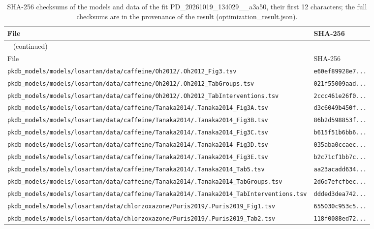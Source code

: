 \documentclass{article}
\begin{document}
\begin{longtable}{ll}
\caption{SHA-256 checksums of the models and data of the fit PD\_20261019\_134029\_\_a3a50, their first 12 characters; the full checksums are in the provenance of the result (optimization\_result.json).}\label{tab:checksums:PD_20261019_134029__a3a50} \\
\toprule
File & SHA-256 \\
\midrule
\endfirsthead
\multicolumn{2}{l}{\small\tablename~\thetable{} (continued)} \\
\toprule
File & SHA-256 \\
\midrule
\endhead
\bottomrule
\endlastfoot
\texttt{pkdb\_models/models/losartan/data/caffeine/Oh2012/.Oh2012\_Fig3.tsv} & \texttt{e60ef89928e7...} \\
\texttt{pkdb\_models/models/losartan/data/caffeine/Oh2012/.Oh2012\_TabGroups.tsv} & \texttt{021f55009aad...} \\
\texttt{pkdb\_models/models/losartan/data/caffeine/Oh2012/.Oh2012\_TabInterventions.tsv} & \texttt{2ccc461e26f0...} \\
\texttt{pkdb\_models/models/losartan/data/caffeine/Tanaka2014/.Tanaka2014\_Fig3A.tsv} & \texttt{d3c6049b450f...} \\
\texttt{pkdb\_models/models/losartan/data/caffeine/Tanaka2014/.Tanaka2014\_Fig3B.tsv} & \texttt{86b2d598853f...} \\
\texttt{pkdb\_models/models/losartan/data/caffeine/Tanaka2014/.Tanaka2014\_Fig3C.tsv} & \texttt{b615f51b6bb6...} \\
\texttt{pkdb\_models/models/losartan/data/caffeine/Tanaka2014/.Tanaka2014\_Fig3D.tsv} & \texttt{035aba0ccaec...} \\
\texttt{pkdb\_models/models/losartan/data/caffeine/Tanaka2014/.Tanaka2014\_Fig3E.tsv} & \texttt{b2c71cf1bb7c...} \\
\texttt{pkdb\_models/models/losartan/data/caffeine/Tanaka2014/.Tanaka2014\_Tab5.tsv} & \texttt{aa23acadd634...} \\
\texttt{pkdb\_models/models/losartan/data/caffeine/Tanaka2014/.Tanaka2014\_TabGroups.tsv} & \texttt{2d6d7efcfbec...} \\
\texttt{pkdb\_models/models/losartan/data/caffeine/Tanaka2014/.Tanaka2014\_TabInterventions.tsv} & \texttt{ddded3dea742...} \\
\texttt{pkdb\_models/models/losartan/data/chlorzoxazone/Puris2019/.Puris2019\_Fig1.tsv} & \texttt{655030c953c5...} \\
\texttt{pkdb\_models/models/losartan/data/chlorzoxazone/Puris2019/.Puris2019\_Tab2.tsv} & \texttt{118f0088ed72...} \\

\end{longtable}
\end{document}
